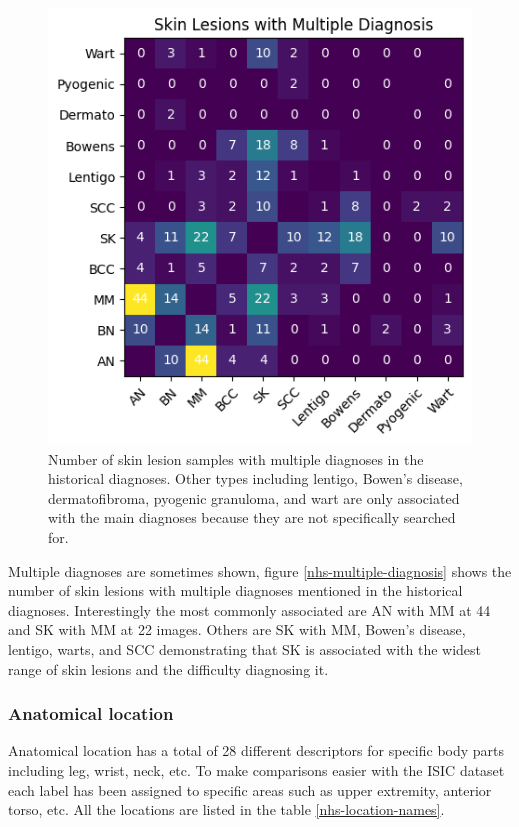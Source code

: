 \begin{figure}
	\centering
	\includegraphics[scale=0.8]{images/nhs/nhs-multiple-diagnosis.png}
	\caption{Number of skin lesion samples with multiple diagnoses in the historical diagnoses. Other types including lentigo, Bowen's disease, dermatofibroma, pyogenic granuloma, and wart are only associated with the main diagnoses because they are not specifically searched for.} 
\end{figure}\label{nhs-multiple-diagnosis}

Multiple diagnoses are sometimes shown, figure \ref{nhs-multiple-diagnosis} shows the number of skin lesions with multiple diagnoses mentioned in the historical diagnoses. Interestingly the most commonly associated are AN with MM at 44 and SK with MM at 22 images. Others are SK with MM, Bowen's disease, lentigo, warts, and SCC demonstrating that SK is associated with the widest range of skin lesions and the difficulty diagnosing it.

\subsubsection{Anatomical location}

Anatomical location has a total of 28 different descriptors for specific body parts including leg, wrist, neck, etc. To make comparisons easier with the ISIC dataset each label has been assigned to specific areas such as upper extremity, anterior torso, etc. All the locations are listed in the table \ref{nhs-location-names}. 

